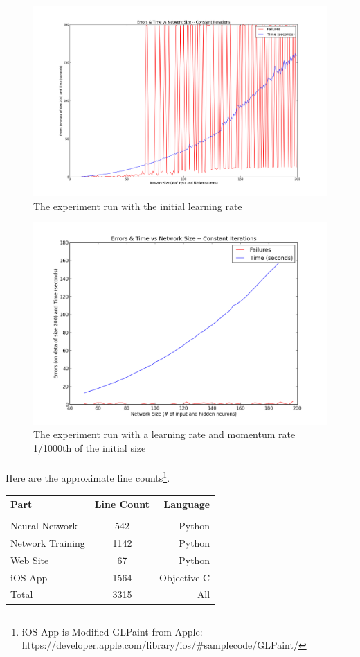 \documentclass{article}
\begin{document}
    \begin{figure}
        \centering
        \includegraphics[scale=0.4]{images/bad_learning.png}
        \caption{The experiment run with the initial learning rate}
        \label{badgraph}
    \end{figure}

    \begin{figure}
        \centering
        \includegraphics[scale=0.5]{images/good_learning.png}
        \caption{The experiment run with a learning rate and momentum rate 1/1000th of
            the initial size}
        \label{goodgraph}
    \end{figure}

    \paragraph{}Here are the approximate line 
    counts\footnote{iOS App is Modified GLPaint from Apple: https://developer.apple.com/library/ios/\#samplecode/GLPaint/}. \\

    \begin{tabular}{ l c r }
        Part & Line Count & Language \\
        \hline \\
        Neural Network & 542 & Python \\
        Network Training & 1142 & Python \\
        Web Site & 67 & Python \\
        iOS App & 1564 & Objective C \\
        Total & 3315 & All \\
    \end{tabular}
\end{document}
